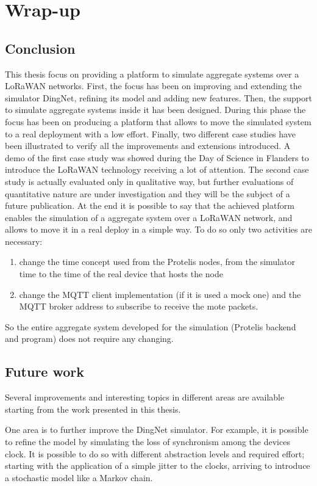 \chapter{Wrap-up}
\label{chap:conclusions}
\section{Conclusion} 
This thesis focus on providing a platform to simulate aggregate systems over a LoRaWAN networks.
First, the focus has been on improving and extending the simulator DingNet, refining its model and adding new features.
Then, the support to simulate aggregate systems inside it has been designed. 
During this phase the focus has been on producing a platform that allows to move the simulated system to a real deployment with a low effort.
Finally, two different case studies have been illustrated to verify all the improvements and extensions introduced.
A demo of the first case study was showed during the Day of Science in Flanders to introduce the LoRaWAN technology receiving a lot of attention.
The second case study is actually evaluated only in qualitative way, but further evaluations of quantitative nature are under investigation and they will be the subject of a future publication.
At the end it is possible to say that the achieved platform enables the simulation of a aggregate system over a LoRaWAN network, and allows to move it in a real deploy in a simple way. 
To do so only two activities are necessary:
\begin{enumerate}
    \item change the time concept used from the Protelis nodes, from the simulator time to the time of the real device that hosts the node
    \item change the MQTT client implementation (if it is used a mock one) and the MQTT broker address to subscribe to receive the mote packets.
\end{enumerate}
 So the entire aggregate system developed for the simulation (Protelis backend and program) does not require any changing.

\section{Future work}
Several improvements and interesting topics in different areas are available starting from the work presented in this thesis.

One area is to further improve the DingNet simulator. 
For example, it is possible to refine the model by simulating the loss of synchronism among the devices clock. 
It is possible to do so with different abstraction levels and required effort; starting with the application of a simple jitter to the clocks, arriving to introduce a stochastic model like a Markov chain.


